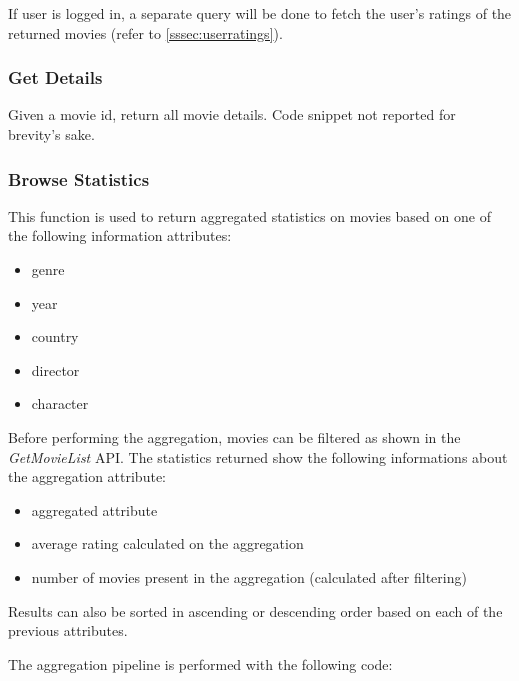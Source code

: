 \documentclass[11pt]{article}
\begin{document}
If user is logged in, a separate query will be done to fetch the user's ratings of the returned movies (refer to \ref{sssec:userratings}).



\subsubsection{Get Details}
Given a movie id, return all movie details. Code snippet not reported for brevity's sake.

\subsubsection{Browse Statistics}
This function is used to return aggregated statistics on movies based on one of the following information attributes:
\begin{itemize}
	\item genre
	\item year
	\item country
	\item director
	\item character
\end{itemize}
Before performing the aggregation, movies can be filtered as shown in the \textit{GetMovieList} API.
The statistics returned show the following informations about the aggregation attribute:
\begin{itemize}
	\item aggregated attribute
	\item average rating calculated on the aggregation
	\item number of movies present in the aggregation (calculated after filtering)
\end{itemize}
Results can also be sorted in ascending or descending order based on each of the previous attributes.

The aggregation pipeline is performed with the following code:


\end{document}
